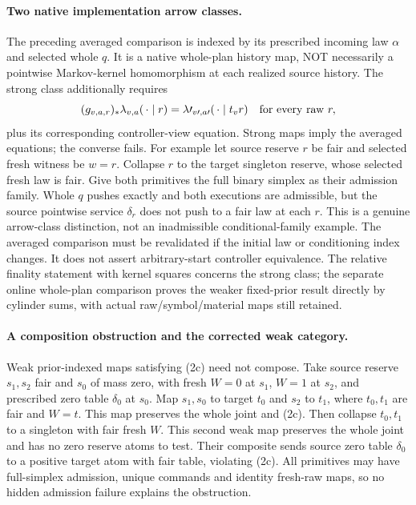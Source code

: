 \documentclass{article}
\begin{document}
\paragraph{Two native implementation arrow classes.}
The preceding averaged comparison is indexed by its prescribed incoming law $\alpha$ and selected whole $q$. It is a native whole-plan history map, NOT necessarily a pointwise Markov-kernel homomorphism at each realized source history. The strong class additionally requires
\[
 (g_{v,a,r})_*\lambda_{v,a}(\,\cdot\mid r)
 =\lambda\prime_{v\prime,a\prime}(\,\cdot\mid t_vr)
\quad\hbox{for every raw }r,
\]
plus its corresponding controller-view equation. Strong maps imply the averaged equations; the converse fails. For example let source reserve $r$ be fair and selected fresh witness be $w=r$. Collapse $r$ to the target singleton reserve, whose selected fresh law is fair. Give both primitives the full binary simplex as their admission family. Whole $q$ pushes exactly and both executions are admissible, but the source pointwise service $\delta_r$ does not push to a fair law at each $r$. This is a genuine arrow-class distinction, not an inadmissible conditional-family example. The averaged comparison must be revalidated if the initial law or conditioning index changes. It does not assert arbitrary-start controller equivalence. The relative finality statement with kernel squares concerns the strong class; the separate online whole-plan comparison proves the weaker fixed-prior result directly by cylinder sums, with actual raw/symbol/material maps still retained.

\paragraph{A composition obstruction and the corrected weak category.}
Weak prior-indexed maps satisfying (2c) need not compose. Take source reserve $s_1,s_2$ fair and $s_0$ of mass zero, with fresh $W=0$ at $s_1$, $W=1$ at $s_2$, and prescribed zero table $\delta_0$ at $s_0$. Map $s_1,s_0$ to target $t_0$ and $s_2$ to $t_1$, where $t_0,t_1$ are fair and $W=t$. This map preserves the whole joint and (2c). Then collapse $t_0,t_1$ to a singleton with fair fresh $W$. This second weak map preserves the whole joint and has no zero reserve atoms to test. Their composite sends source zero table $\delta_0$ to a positive target atom with fair table, violating (2c). All primitives may have full-simplex admission, unique commands and identity fresh-raw maps, so no hidden admission failure explains the obstruction.
\end{document}
